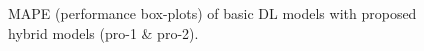 \documentclass[a4paper, fleqn]{cas-sc}
\begin{document}
\begin{figure}[h!]
    \caption{MAPE (performance box-plots) of basic DL models with proposed hybrid models (pro-1 \& pro-2).}
    \label{Fig:17}
  \end{figure}
\end{document}
